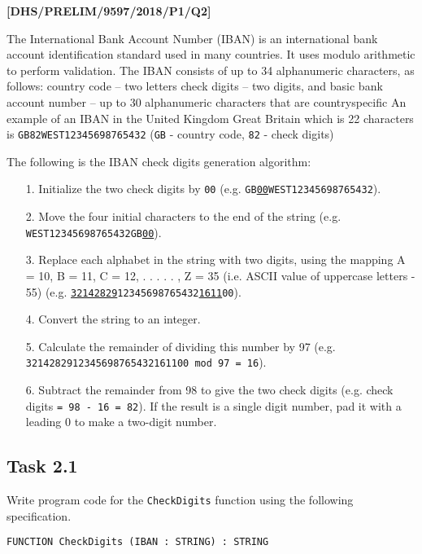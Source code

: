 \item \textbf{{[}DHS/PRELIM/9597/2018/P1/Q2{]} }

The International Bank Account Number (IBAN) is an international bank
account identification standard used in many countries. It uses modulo
arithmetic to perform validation. The IBAN consists of up to 34 alphanumeric
characters, as follows: country code -- two letters check digits
-- two digits, and basic bank account number -- up to 30 alphanumeric
characters that are countryspecific An example of an IBAN in the United
Kingdom Great Britain which is 22 characters is \texttt{GB82WEST12345698765432}
(\texttt{GB} - country code, \texttt{82} - check digits) 

The following is the IBAN check digits generation algorithm: 
\begin{enumerate}
\item[1.]  Initialize the two check digits by \texttt{00} (e.g. \texttt{GB}\texttt{\uline{00}}\texttt{WEST12345698765432}).
\item[2.]  Move the four initial characters to the end of the string (e.g.
\texttt{WEST12345698765432GB}\texttt{\uline{00}}). 
\item[3.]  Replace each alphabet in the string with two digits, using the mapping
A = 10, B = 11, C = 12, . . . . . , Z = 35 (i.e. ASCII value of uppercase
letters - 55) (e.g. \texttt{\uline{32142829}}\texttt{12345698765432}\texttt{\uline{1611}}\texttt{00}). 
\item[4.]  Convert the string to an integer. 
\item[5.]  Calculate the remainder of dividing this number by 97 (e.g. \texttt{3214282912345698765432161100
mod 97 = 16}).
\item[6.]  Subtract the remainder from 98 to give the two check digits (e.g.
check digits \texttt{= 98 - 16 = 82}). If the result is a single digit
number, pad it with a leading 0 to make a two-digit number. 
\end{enumerate}

\subsection*{Task 2.1 }

Write program code for the \texttt{CheckDigits} function using the
following specification. 
\noindent \begin{center}
\texttt{FUNCTION CheckDigits (IBAN : STRING) : STRING }
\par\end{center}

